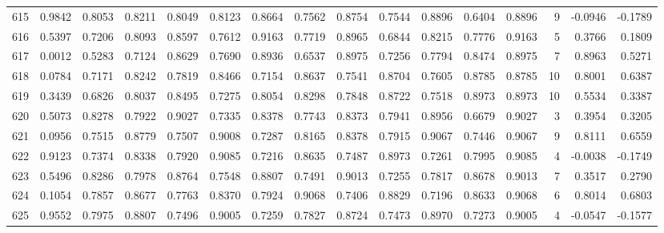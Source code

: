 \begin{tabular}{lrrrrrrrrrrrrrrr}
615 &      0.9842 &  0.8053 &  0.8211 &  0.8049 &  0.8123 &  0.8664 &  0.7562 &  0.8754 &  0.7544 &  0.8896 &   0.6404 &     0.8896 &      9 &                   -0.0946 &                    -0.1789 \\
616 &      0.5397 &  0.7206 &  0.8093 &  0.8597 &  0.7612 &  0.9163 &  0.7719 &  0.8965 &  0.6844 &  0.8215 &   0.7776 &     0.9163 &      5 &                    0.3766 &                     0.1809 \\
617 &      0.0012 &  0.5283 &  0.7124 &  0.8629 &  0.7690 &  0.8936 &  0.6537 &  0.8975 &  0.7256 &  0.7794 &   0.8474 &     0.8975 &      7 &                    0.8963 &                     0.5271 \\
618 &      0.0784 &  0.7171 &  0.8242 &  0.7819 &  0.8466 &  0.7154 &  0.8637 &  0.7541 &  0.8704 &  0.7605 &   0.8785 &     0.8785 &     10 &                    0.8001 &                     0.6387 \\
619 &      0.3439 &  0.6826 &  0.8037 &  0.8495 &  0.7275 &  0.8054 &  0.8298 &  0.7848 &  0.8722 &  0.7518 &   0.8973 &     0.8973 &     10 &                    0.5534 &                     0.3387 \\
620 &      0.5073 &  0.8278 &  0.7922 &  0.9027 &  0.7335 &  0.8378 &  0.7743 &  0.8373 &  0.7941 &  0.8956 &   0.6679 &     0.9027 &      3 &                    0.3954 &                     0.3205 \\
621 &      0.0956 &  0.7515 &  0.8779 &  0.7507 &  0.9008 &  0.7287 &  0.8165 &  0.8378 &  0.7915 &  0.9067 &   0.7446 &     0.9067 &      9 &                    0.8111 &                     0.6559 \\
622 &      0.9123 &  0.7374 &  0.8338 &  0.7920 &  0.9085 &  0.7216 &  0.8635 &  0.7487 &  0.8973 &  0.7261 &   0.7995 &     0.9085 &      4 &                   -0.0038 &                    -0.1749 \\
623 &      0.5496 &  0.8286 &  0.7978 &  0.8764 &  0.7548 &  0.8807 &  0.7491 &  0.9013 &  0.7255 &  0.7817 &   0.8678 &     0.9013 &      7 &                    0.3517 &                     0.2790 \\
624 &      0.1054 &  0.7857 &  0.8677 &  0.7763 &  0.8370 &  0.7924 &  0.9068 &  0.7406 &  0.8829 &  0.7196 &   0.8633 &     0.9068 &      6 &                    0.8014 &                     0.6803 \\
625 &      0.9552 &  0.7975 &  0.8807 &  0.7496 &  0.9005 &  0.7259 &  0.7827 &  0.8724 &  0.7473 &  0.8970 &   0.7273 &     0.9005 &      4 &                   -0.0547 &                    -0.1577 \\

\end{tabular}
